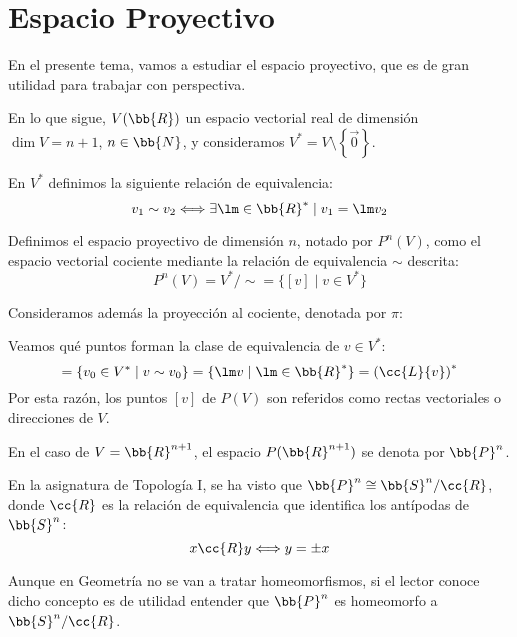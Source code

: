 \chapter{Espacio Proyectivo}

En el presente tema, vamos a estudiar el espacio proyectivo, que es de gran utilidad para trabajar con perspectiva.

En lo que sigue, $V(\bb{R})$ un espacio vectorial real de dimensión $\dim V = n+1$, $n\in \bb{N}$, y consideramos $V^\ast = V\setminus \left\{\vec{0}\right\}$.

\begin{definicion}
    En $V^\ast$ definimos la siguiente relación de equivalencia:
    \begin{equation*}
        v_1 \sim v_2 \Longleftrightarrow \exists \lm \in \bb{R}^\ast \mid v_1=\lm v_2
    \end{equation*}
    
    Definimos el espacio proyectivo de dimensión $n$, notado por $P^n(V)$, como el espacio vectorial cociente mediante la relación de equivalencia $\sim$ descrita:
    \begin{equation*}
        P^n(V) = V^\ast/\sim = \{[v]\mid v\in V^\ast\}
    \end{equation*}

    Consideramos además la proyección al cociente, denotada por $\pi$:
\end{definicion}

Veamos qué puntos forman la clase de equivalencia de $v\in V^\ast$:
\begin{equation*}
    [v] = \{v_0\in V^\ast \mid v\sim v_0\} = \{\lm v \mid \lm \in \bb{R}^\ast\} = \left(\cc{L}\{v\}\right)^\ast
\end{equation*}
Por esta razón, los puntos $[v]$ de $P(V)$ son referidos como rectas vectoriales o direcciones de $V$.


\begin{notacion}
    En el caso de $V=\bb{R}^{n+1}$, el espacio $P(\bb{R}^{n+1})$ se denota por $\bb{P}^n$.
\end{notacion}
\begin{observacion}
    En la asignatura de Topología I, se ha visto que $\bb{P}^n \cong \bb{S}^n/\cc{R}$, donde $\cc{R}$ es la relación de equivalencia que identifica los antípodas de $\bb{S}^n$:
    \begin{equation*}
        x \cc{R} y \Longleftrightarrow y = \pm x
    \end{equation*}

    Aunque en Geometría no se van a tratar homeomorfismos, si el lector conoce dicho concepto es de utilidad entender que $\bb{P}^n$ es homeomorfo a $\bb{S}^n/\cc{R}$.
\end{observacion}



